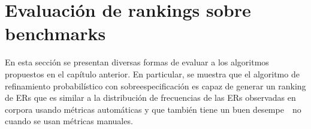 \chapter{Evaluaci\'on de rankings sobre benchmarks}
\label{sec:evaluacion}

En esta secci\'on se presentan diversas formas de evaluar a los algoritmos propuestos en el cap\'itulo anterior. En particular, se muestra que el algoritmo de refinamiento probabil\'{i}stico con sobreespecificaci\'on es capaz de generar un ranking de ERs que es similar a la distribuci\'on de frecuencias de las ERs observadas en corpora usando m\'etricas autom\'aticas y que tambi\'en tiene un buen desempe\ ~no cuando se usan m\'etricas manuales. 



